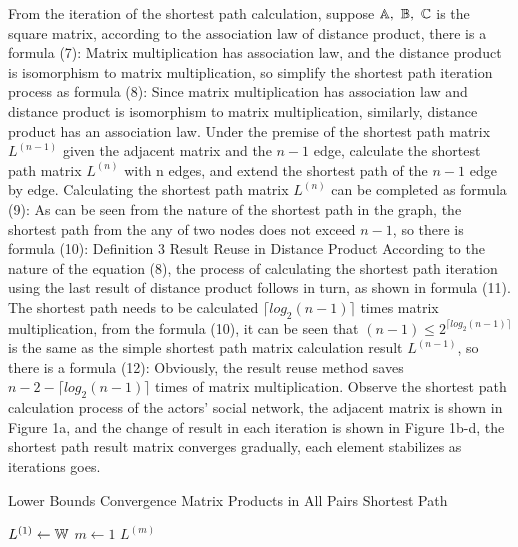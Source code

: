 \documentclass[review]{cvpr}
\begin{document}
From the iteration of the shortest path calculation, suppose \(\Bbb A,\ \Bbb B,\ \Bbb C\) is the square matrix, according to the association law of distance product, there is a formula (7):
Matrix multiplication has association law, and the distance product is isomorphism to matrix multiplication, so simplify the shortest path iteration process as formula (8):
Since matrix multiplication has association law and distance product is isomorphism to matrix multiplication, similarly, distance product has an association law.
Under the premise of the shortest path matrix $L^{(n-1)}$ given the adjacent matrix and the $n-1$ edge, calculate the shortest path matrix $L^{(n)}$ with n edges, and extend the shortest path of the $n-1$ edge by edge.
Calculating the shortest path matrix $L^{(n)}$ can be completed as formula (9):
As can be seen from the nature of the shortest path in the graph, the shortest path from the any of two nodes does not exceed $n-1$, so there is formula (10):
Definition 3 Result Reuse in Distance Product According to the nature of the equation (8), the process of calculating the shortest path iteration using the last result of distance product follows in turn, as shown in formula (11).
The shortest path needs to be calculated $\lceil{log_2(n-1)}\rceil$ times matrix multiplication, from the formula (10), it can be seen that $(n-1)\leq2^{\lceil{log_2(n-1)}\rceil}$ is the same as the simple shortest path matrix calculation result $L^{(n-1)}$, so there is a formula (12):
Obviously, the result reuse method saves $n-2-\lceil{log_2(n-1)}\rceil$ times of matrix multiplication.
Observe the shortest path calculation process of the actors' social network, the adjacent matrix is shown in Figure 1a, and the change of result in each iteration is shown in Figure 1b-d, the shortest path result matrix converges gradually, each element stabilizes as iterations goes.


\begin{algorithm}
\caption{Lower Bounds Convergence Matrix Products in All Pairs Shortest Path}\label{algorithm}
$L^{(1)}\leftarrow \Bbb W$\;
$m\leftarrow 1$\;
 $L^{(m)}$\;
\end{algorithm}
\end{document}
